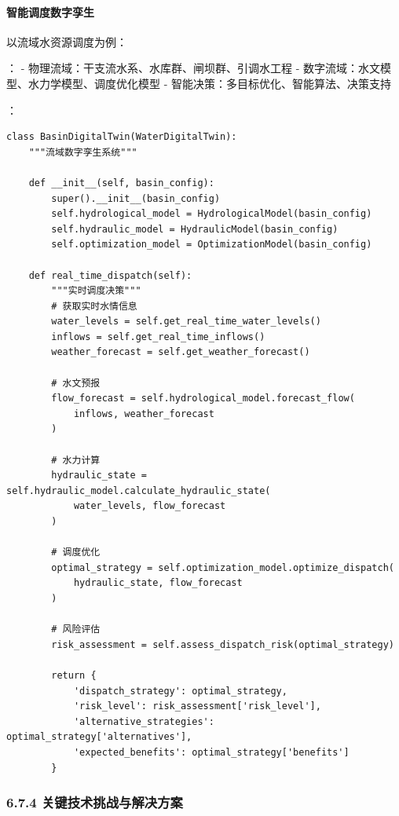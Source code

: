 \hypertarget{ux667aux80fdux8c03ux5ea6ux6570ux5b57ux5b6aux751f}{%
\paragraph{智能调度数字孪生}\label{ux667aux80fdux8c03ux5ea6ux6570ux5b57ux5b6aux751f}}

以流域水资源调度为例：

： - 物理流域：干支流水系、水库群、闸坝群、引调水工程 - 数字流域：水文模型、水力学模型、调度优化模型 - 智能决策：多目标优化、智能算法、决策支持

：

\begin{lstlisting}[style=python]
class BasinDigitalTwin(WaterDigitalTwin):
    """流域数字孪生系统"""
    
    def __init__(self, basin_config):
        super().__init__(basin_config)
        self.hydrological_model = HydrologicalModel(basin_config)
        self.hydraulic_model = HydraulicModel(basin_config)
        self.optimization_model = OptimizationModel(basin_config)
        
    def real_time_dispatch(self):
        """实时调度决策"""
        # 获取实时水情信息
        water_levels = self.get_real_time_water_levels()
        inflows = self.get_real_time_inflows()
        weather_forecast = self.get_weather_forecast()
        
        # 水文预报
        flow_forecast = self.hydrological_model.forecast_flow(
            inflows, weather_forecast
        )
        
        # 水力计算
        hydraulic_state = self.hydraulic_model.calculate_hydraulic_state(
            water_levels, flow_forecast
        )
        
        # 调度优化
        optimal_strategy = self.optimization_model.optimize_dispatch(
            hydraulic_state, flow_forecast
        )
        
        # 风险评估
        risk_assessment = self.assess_dispatch_risk(optimal_strategy)
        
        return {
            'dispatch_strategy': optimal_strategy,
            'risk_level': risk_assessment['risk_level'],
            'alternative_strategies': optimal_strategy['alternatives'],
            'expected_benefits': optimal_strategy['benefits']
        }
\end{lstlisting}

\hypertarget{ux5173ux952eux6280ux672fux6311ux6218ux4e0eux89e3ux51b3ux65b9ux6848}{%
\subsubsection{6.7.4 关键技术挑战与解决方案}\label{ux5173ux952eux6280ux672fux6311ux6218ux4e0eux89e3ux51b3ux65b9ux6848}}

